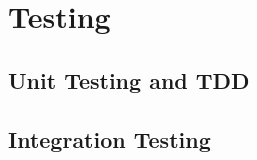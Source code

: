 \documentclass{article}
\begin{document}
\clearpage

\section{Testing}
\subsection{Unit Testing and TDD}
\subsection{Integration Testing}
\end{document}
